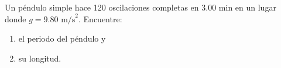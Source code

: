 \item Un péndulo simple hace 120 oscilaciones completas en $3.00\text{ min}$ en un lugar donde $g = 9.80\text{ m/s}^2$. Encuentre:
\begin{enumerate}
    \item el periodo del péndulo y
    \item su longitud.
\end{enumerate}